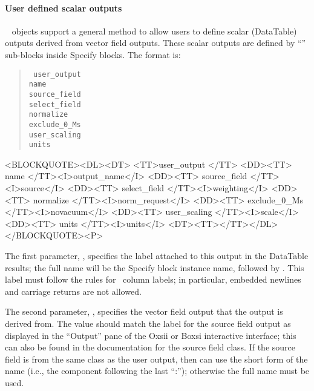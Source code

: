 \paragraph{User defined scalar outputs}%
\label{par:userScalarOutputs}
\OOMMF\  objects support a general method to allow users to
define scalar (DataTable) outputs derived from vector field outputs.
These scalar outputs are defined by ``'' sub-blocks inside
Specify blocks.  The format is:
      \begin{latexonly}
      \begin{quote}\tt
      user\_output \ocb\\
       \bi name \\
       \bi source\_field \\
       \bi select\_field \\
       \bi normalize \\
       \bi exclude\_0\_Ms \\
       \bi user\_scaling \\
       \bi units \\
      \ccb
      \end{quote}
      \end{latexonly}
      \begin{rawhtml}<BLOCKQUOTE><DL><DT>
      <TT>user_output {</TT>
      <DD><TT> name </TT><I>output_name</I>
      <DD><TT> source_field </TT><I>source</I>
      <DD><TT> select_field </TT><I>weighting</I>
      <DD><TT> normalize </TT><I>norm_request</I>
      <DD><TT> exclude_0_Ms </TT><I>novacuum</I>
      <DD><TT> user_scaling </TT><I>scale</I>
      <DD><TT> units </TT><I>units</I>
      <DT><TT>}</TT></DL></BLOCKQUOTE><P>
      \end{rawhtml}
The first parameter, , specifies the label attached to
this output in the DataTable results; the full name will be the Specify
block instance name, followed by .  This label
must follow the rules for \ODT\ column labels; in particular, embedded
newlines and carriage returns are not allowed.

The second parameter, , specifies the vector
field output that the output is derived from.  The  value
should match the label for the source field output as displayed in the
``Output'' pane of the Oxsii or Boxsi interactive interface; this can
also be found in the documentation for the source field 
class.  If the source field is from the same class as the user output,
then  can use the short form of the name (i.e., the
component following the last ``:''); otherwise the full name must be
used.

